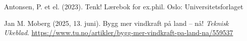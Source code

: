     Antonsen, P. et el. (2023). Tenk! Lærebok for ex.phil. Oslo: Universitetsforlaget

    Jan M. Moberg (2025, 13. juni).
    Bygg mer vindkraft på land – nå!
    \emph{Teknisk Ukeblad}.
    \url{https://www.tu.no/artikler/bygg-mer-vindkraft-pa-land-na/559537}

